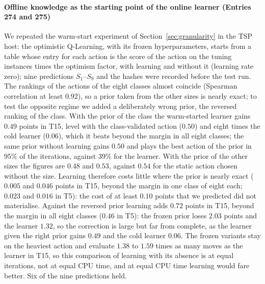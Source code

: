 \paragraph{Offline knowledge as the starting point of the online learner (Entries 274 and 275)} We repeated the warm-start experiment of Section~\ref{sec:granularity} in the TSP host: the optimistic Q-Learning, with its frozen hyperparameters, starts from a table whose entry for each action is the score of the action on the tuning instances times the optimism factor, with learning and without it (learning rate zero); nine predictions $S_1$--$S_9$ and the hashes were recorded before the test run. The rankings of the actions of the eight classes almost coincide (Spearman correlation at least $0.92$), so a prior taken from the other sizes is nearly exact; to test the opposite regime we added a deliberately wrong prior, the reversed ranking of the class. With the prior of the class the warm-started learner gains $0.49$ points in T15, level with the class-validated action ($0.50$) and eight times the cold learner ($0.06$), which it beats beyond the margin in all eight classes; the same prior without learning gains $0.50$ and plays the best action of the prior in $95\%$ of the iterations, against $39\%$ for the learner. With the prior of the other sizes the figures are $0.48$ and $0.53$, against $0.54$ for the static action chosen without the size. Learning therefore costs little where the prior is nearly exact ($0.005$ and $0.046$ points in T15, beyond the margin in one class of eight each; $0.023$ and $0.016$ in T5): the cost of at least $0.10$ points that we predicted did not materialise. Against the reversed prior learning adds $0.72$ points in T15, beyond the margin in all eight classes ($0.46$ in T5): the frozen prior loses $2.03$ points and the learner $1.32$, so the correction is large but far from complete, as the learner given the right prior gains $0.49$ and the cold learner $0.06$. The frozen variants stay on the heaviest action and evaluate $1.38$ to $1.59$ times as many moves as the learner in T15, so this comparison of learning with its absence is at equal iterations, not at equal CPU time, and at equal CPU time learning would fare better. Six of the nine predictions held.

